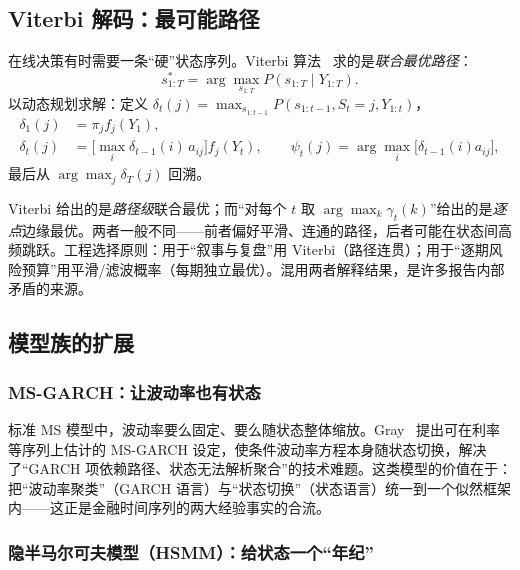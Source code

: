 \subsection{Viterbi 解码：最可能路径}

在线决策有时需要一条“硬”状态序列。Viterbi 算法~\cite{viterbi1967} 求的是\emph{联合最优路径}：
\begin{equation}
s^*_{1:T} = \arg\max_{s_{1:T}} P(s_{1:T} \mid Y_{1:T}).
\end{equation}
以动态规划求解：定义 $\delta_t(j) = \max_{s_{1:t-1}} P(s_{1:t-1}, S_t = j, Y_{1:t})$，
\begin{align}
\delta_1(j) &= \pi_j f_j(Y_1), \\
\delta_t(j) &= \Big[\max_i \delta_{t-1}(i)\, a_{ij}\Big] f_j(Y_t), \qquad
\psi_t(j) = \arg\max_i \big[\delta_{t-1}(i) a_{ij}\big],
\end{align}
最后从 $\arg\max_j \delta_T(j)$ 回溯。

\begin{remark}
Viterbi 给出的是\emph{路径级}联合最优；而“对每个 $t$ 取 $\arg\max_k \gamma_t(k)$”给出的是\emph{逐点}边缘最优。两者一般不同——前者偏好平滑、连通的路径，后者可能在状态间高频跳跃。工程选择原则：用于“叙事与复盘”用 Viterbi（路径连贯）；用于“逐期风险预算”用平滑/滤波概率（每期独立最优）。混用两者解释结果，是许多报告内部矛盾的来源。
\end{remark}

\subsection{模型族的扩展}

\subsubsection{MS-GARCH：让波动率也有状态}

标准 MS 模型中，波动率要么固定、要么随状态整体缩放。Gray~\cite{gray1996} 提出可在利率等序列上估计的 MS-GARCH 设定，使条件波动率方程本身随状态切换，解决了“GARCH 项依赖路径、状态无法解析聚合”的技术难题。这类模型的价值在于：把“波动率聚类”（GARCH 语言）与“状态切换”（状态语言）统一到一个似然框架内——这正是金融时间序列的两大经验事实的合流。

\subsubsection{隐半马尔可夫模型（HSMM）：给状态一个“年纪”}

